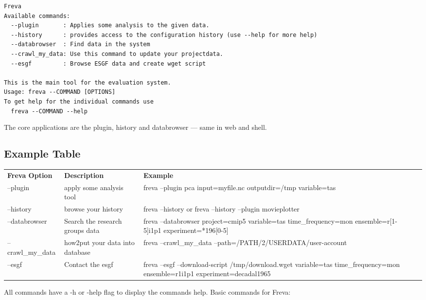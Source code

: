 \documentclass[a4paper,11pt]{ltxdoc}
\begin{document}
\begin{lstlisting} 
Freva
Available commands:
  --plugin       : Applies some analysis to the given data.
  --history      : provides access to the configuration history (use --help for more help)
  --databrowser  : Find data in the system
  --crawl_my_data: Use this command to update your projectdata.
  --esgf         : Browse ESGF data and create wget script

This is the main tool for the evaluation system.
Usage: freva --COMMAND [OPTIONS]
To get help for the individual commands use
  freva --COMMAND --help
\end{lstlisting}

The core applications are the plugin, history and databrowser --- same in web and shell.

\subsection*{Example Table}
\begin{tabular}{lllll}
\cline{1-1}
\multicolumn{1}{|l|}{\textbf{Freva Option} }  & \multicolumn{1}{|l|}{\textbf{Description}}  & \multicolumn{1}{|l|}{\textbf{Example} }   \\
--plugin & apply some analysis tool &  freva --plugin pca input=myfile.nc outputdir=/tmp variable=tas  \\
--history & browse your history & freva --history or freva --history --plugin movieplotter \\
--databrowser & Search the research groups data  &  freva --databrowser project=cmip5 variable=tas time\_frequency=mon ensemble=r[1-5]i1p1 experiment=*196[0-5] \\
--crawl\_my\_data & how2put your data into database & freva --crawl\_my\_data --path=/PATH/2/USERDATA/user-account \\
--esgf & Contact the esgf & freva --esgf --download-script /tmp/download.wget variable=tas time\_frequency=mon ensemble=r1i1p1 experiment=decadal1965
\end{tabular}

All commands have a -h or -\-help flag to display the commands help.
Basic commands for Freva: 
\end{document}

